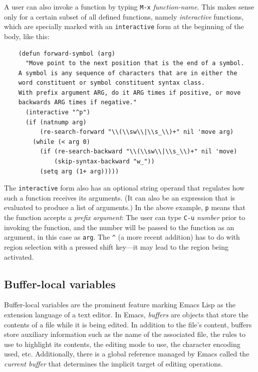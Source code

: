 \documentclass[format=acmsmall, review]{acmart}
\newcommand \Elisp {Emacs Lisp}
\begin{document}
A user can also invoke a function by typing \texttt{M-x}
\emph{function-name}.  This makes sense only for a certain subset of
all defined functions, namely \emph{interactive} functions, which
are specially marked with an \texttt{interactive} form at the
beginning of the body, like this:
\begin{verbatim}
    (defun forward-symbol (arg)
      "Move point to the next position that is the end of a symbol.
    A symbol is any sequence of characters that are in either the
    word constituent or symbol constituent syntax class.
    With prefix argument ARG, do it ARG times if positive, or move
    backwards ARG times if negative."
      (interactive "^p")
      (if (natnump arg)
          (re-search-forward "\\(\\sw\\|\\s_\\)+" nil 'move arg)
        (while (< arg 0)
          (if (re-search-backward "\\(\\sw\\|\\s_\\)+" nil 'move)
              (skip-syntax-backward "w_"))
          (setq arg (1+ arg)))))
\end{verbatim}
The \texttt{interactive} form also has an optional string operand that
regulates how such a function receives its arguments.  (It can also be
an expression that is evaluated to produce a list of arguments.)  In the above
example, \verb|p| means that the function accepts a \emph{prefix
  argument}: The user can type \texttt{C-u} \emph{number}
prior to invoking the function,
and the number will be passed to the function as an argument, in this
case as \texttt{arg}.  The \verb|^| (a more recent addition) has to do with
region selection with a pressed shift key---it may lead to the region
being activated.

\subsection{Buffer-local variables}
\label{sec:buffer-local-variables}

Buffer-local variables are the prominent feature marking \Elisp{} as the
extension language of a text editor.  In Emacs, \emph{buffers} are objects
that store the contents of a file while it is being edited.  In addition to
the file's content, buffers store auxiliary information such
as the name of the associated file, the rules to use to highlight its
contents, the editing mode to use, the character encoding used, etc.
Additionally, there is a global reference managed by Emacs called the
\emph{current buffer} that determines the implicit target of
editing operations.
\end{document}
